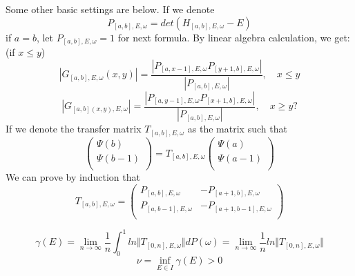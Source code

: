 Some other basic settings are below. If we denote
\[
  P_{[a,b],E,\omega}=det(H_{[a,b],E,\omega}-E)
\]
if $a=b$, let $  P_{[a,b],E,\omega}=1$ for next formula.
By linear algebra calculation, we get:(if $x\leq y$)
\begin{equation}\label{A}
  \left\vert G_{[a,b],E,\omega}(x,y)\right\vert=\frac{\left\vert P_{[a,x-1],E,\omega}P_{[y+1,b],E,\omega}\right\vert}{\left\vert P_{[a,b],E,\omega}\right\vert},\quad x\leq y
\end{equation}
  \[
  \left\vert G_{[a,b](x,y),E,\omega}\right\vert=\frac{\left\vert P_{[a,y-1],E,\omega}P_{[x+1,b],E,\omega}\right\vert}{\left\vert P_{[a,b],E,\omega}\right\vert},\quad x\geq y?
\]
If we denote the transfer matrix $T_{[a,b],E,\omega}$ as the matrix such that
\[
\left(
\begin{array}{c}
  \Psi(b)\\
  \Psi(b-1)\\
\end{array}
\right)
=T_{[a,b],E,\omega} \left(
\begin{array}{c}
  \Psi(a)\\
  \Psi(a-1)\\
\end{array}
\right)
\]
We can prove by induction that
\[
T_{[a,b],E,\omega}=\left(
  \begin{array}{cc}
    P_{[a,b],E,\omega} & -P_{[a+1,b],E,\omega}\\
    P_{[a,b-1],E,\omega} & -P_{[a+1,b-1],E,\omega}\\
  \end{array}
  \right)
\]
\begin{definition}
  \[
    \gamma(E)=\lim_{n\to\infty}\frac{1}{n}\int_0^1 ln\Vert T_{[0,n],E,\omega}\Vert dP(\omega)=\lim_{n\rightarrow\infty}\frac{1}{n} ln\Vert T_{[0,n],E,\omega}\Vert
  \]
  \[\nu=\inf\limits_{E\in I}\gamma(E)>0\]
\end{definition}


